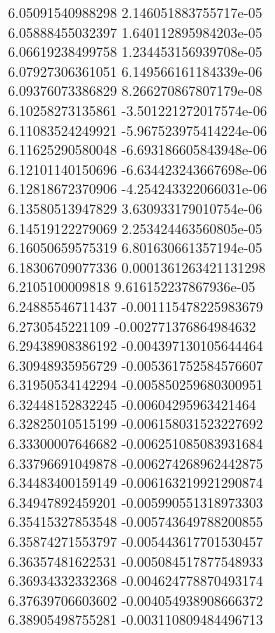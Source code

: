 {6.05091540988298 2.146051883755717e-05 \\
6.05888455032397 1.640112895984203e-05 \\
6.06619238499758 1.234453156939708e-05 \\
6.07927306361051 6.149566161184339e-06 \\
6.09376073386829 8.266270867807179e-08 \\
6.10258273135861 -3.501221272017574e-06 \\
6.11083524249921 -5.967523975414224e-06 \\
6.11625290580048 -6.693186605843948e-06 \\
6.12101140150696 -6.634423243667698e-06 \\
6.12818672370906 -4.254243322066031e-06 \\
6.13580513947829 3.630933179010754e-06 \\
6.14519122279069 2.253424463560805e-05 \\
6.16050659575319 6.801630661357194e-05 \\
6.18306709077336 0.0001361263421131298 \\
6.2105100009818 9.616152237867936e-05 \\
6.24885546711437 -0.001115478225983679 \\
6.2730545221109 -0.002771376864984632 \\
6.29438908386192 -0.004397130105644464 \\
6.30948935956729 -0.005361752584576607 \\
6.31950534142294 -0.005850259680300951 \\
6.32448152832245 -0.00604295963421464 \\
6.32825010515199 -0.006158031523227692 \\
6.33300007646682 -0.006251085083931684 \\
6.33796691049878 -0.006274268962442875 \\
6.34483400159149 -0.006163219921290874 \\
6.34947892459201 -0.005990551318973303 \\
6.35415327853548 -0.005743649788200855 \\
6.35874271553797 -0.005443617701530457 \\
6.36357481622531 -0.005084517877548933 \\
6.36934332332368 -0.004624778870493174 \\
6.37639706603602 -0.004054938908666372 \\
6.38905498755281 -0.003110809484496713 \\
}
